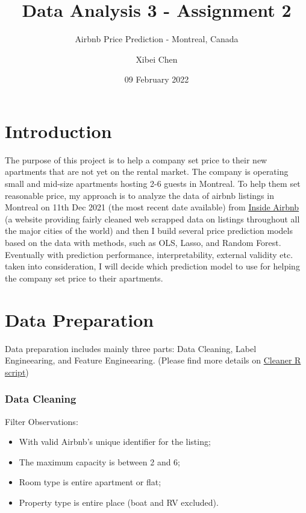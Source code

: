 \documentclass[
]{article}
\title{Data Analysis 3 - Assignment 2}
\subtitle{Airbnb Price Prediction - Montreal, Canada}
\author{Xibei Chen}
\date{09 February 2022}
\providecommand{\tightlist}{%
  \setlength{\itemsep}{0pt}\setlength{\parskip}{0pt}}
\begin{document}
\maketitle

\hypertarget{introduction}{%
\section{Introduction}\label{introduction}}

The purpose of this project is to help a company set price to their new
apartments that are not yet on the rental market. The company is
operating small and mid-size apartments hosting 2-6 guests in Montreal.
To help them set reasonable price, my approach is to analyze the data of
airbnb listings in Montreal on 11th Dec 2021 (the most recent date
available) from \href{http://insideairbnb.com/get-the-data.html}{Inside
Airbnb} (a website providing fairly cleaned web scrapped data on
listings throughout all the major cities of the world) and then I build
several price prediction models based on the data with methods, such as
OLS, Lasso, and Random Forest. Eventually with prediction performance,
interpretability, external validity etc. taken into consideration, I
will decide which prediction model to use for helping the company set
price to their apartments.

\hypertarget{data-preparation}{%
\section{Data Preparation}\label{data-preparation}}

Data preparation includes mainly three parts: Data Cleaning, Label
Engineearing, and Feature Engineearing. (Please find more details on
\href{https://github.com/xibei-chen/DA3/blob/main/assignment_2/montreal_20211211_cleaner.R}{Cleaner
R script})

\hypertarget{data-cleaning}{%
\subsubsection{Data Cleaning}\label{data-cleaning}}

Filter Observations:

\begin{itemize}
\tightlist
\item
  With valid Airbnb's unique identifier for the listing;
\item
  The maximum capacity is between 2 and 6;
\item
  Room type is entire apartment or flat;
\item
  Property type is entire place (boat and RV excluded).
\end{itemize}
\end{document}
